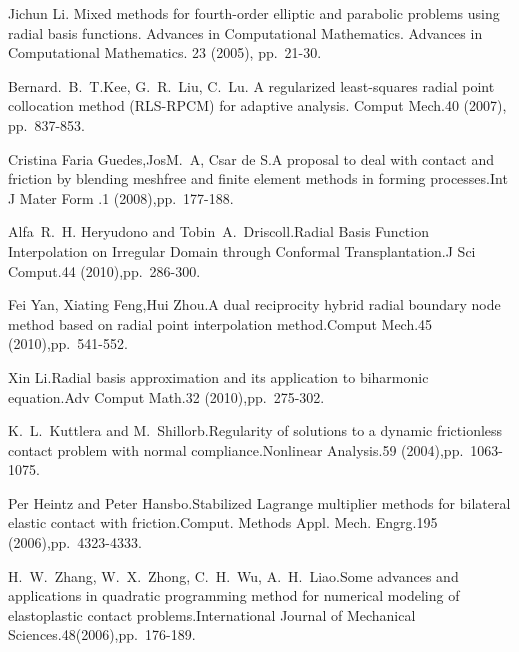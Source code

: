 
\begin{thebibliography}{10}
{\sc Jichun Li}. {Mixed methods for fourth-order elliptic and parabolic problems using radial basis functions. Advances in Computational Mathematics}. Advances in Computational Mathematics. 23 (2005), pp.~21-30.

{\sc Bernard.~B.~T.Kee, G.~R.~Liu, C.~Lu}. {A regularized least-squares radial point collocation method (RLS-RPCM) for adaptive analysis}. Comput Mech.40 (2007), pp.~837-853.

{\sc Cristina Faria Guedes,JosM.~A, Csar de S}.{A proposal to deal with contact and friction by blending meshfree and finite element methods in forming processes}.Int J Mater Form .1 (2008),pp.~177-188.

{\sc Alfa~R.~H. Heryudono and Tobin~A.~Driscoll}.{Radial Basis Function Interpolation on Irregular Domain through Conformal Transplantation}.J Sci Comput.44 (2010),pp.~286-300.

{\sc Fei Yan, Xiating Feng,Hui Zhou}.{A dual reciprocity hybrid radial boundary node method based on radial point interpolation method}.Comput Mech.45 (2010),pp.~541-552.

{\sc Xin Li}.{Radial basis approximation and its application to biharmonic equation}.Adv Comput Math.32 (2010),pp.~275-302.

{\sc K.~L.~Kuttlera and M.~Shillorb}.{Regularity of solutions to a dynamic frictionless contact problem with normal compliance}.Nonlinear Analysis.59 (2004),pp.~1063-1075.

{\sc Per Heintz and Peter Hansbo}.{Stabilized Lagrange multiplier methods for bilateral elastic contact with friction}.Comput. Methods Appl. Mech. Engrg.195 (2006),pp.~4323-4333.

{\sc H.~W.~Zhang, W.~X.~Zhong, C.~H.~Wu, A.~H.~Liao}.{Some advances and applications in quadratic programming method for numerical modeling of elastoplastic contact problems}.International Journal of Mechanical Sciences.48(2006),pp.~176-189.
\end{thebibliography}